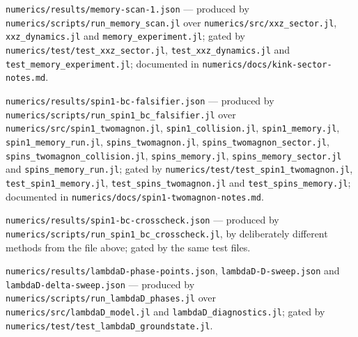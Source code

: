\texttt{numerics/\allowbreak{}results/\allowbreak{}memory-\allowbreak{}scan-\allowbreak{}1.json} --- produced by
\texttt{numerics/\allowbreak{}scripts/\allowbreak{}run\_\allowbreak{}memory\_\allowbreak{}scan.jl} over
\texttt{numerics/\allowbreak{}src/\allowbreak{}xxz\_\allowbreak{}sector.jl}, \texttt{xxz\_\allowbreak{}dynamics.jl} and
\texttt{memory\_\allowbreak{}experiment.jl}; gated by
\texttt{numerics/\allowbreak{}test/\allowbreak{}test\_\allowbreak{}xxz\_\allowbreak{}sector.jl},
\texttt{test\_\allowbreak{}xxz\_\allowbreak{}dynamics.jl} and \texttt{test\_\allowbreak{}memory\_\allowbreak{}experiment.jl};
documented in \texttt{numerics/\allowbreak{}docs/\allowbreak{}kink-\allowbreak{}sector-\allowbreak{}notes.md}.

\texttt{numerics/\allowbreak{}results/\allowbreak{}spin1-\allowbreak{}bc-\allowbreak{}falsifier.json} --- produced by
\texttt{numerics/\allowbreak{}scripts/\allowbreak{}run\_\allowbreak{}spin1\_\allowbreak{}bc\_\allowbreak{}falsifier.jl} over
\texttt{numerics/\allowbreak{}src/\allowbreak{}spin1\_\allowbreak{}twomagnon.jl}, \texttt{spin1\_\allowbreak{}collision.jl},
\texttt{spin1\_\allowbreak{}memory.jl}, \texttt{spin1\_\allowbreak{}memory\_\allowbreak{}run.jl},
\texttt{spins\_\allowbreak{}twomagnon.jl}, \texttt{spins\_\allowbreak{}twomagnon\_\allowbreak{}sector.jl},
\texttt{spins\_\allowbreak{}twomagnon\_\allowbreak{}collision.jl}, \texttt{spins\_\allowbreak{}memory.jl},
\texttt{spins\_\allowbreak{}memory\_\allowbreak{}sector.jl} and \texttt{spins\_\allowbreak{}memory\_\allowbreak{}run.jl}; gated by
\texttt{numerics/\allowbreak{}test/\allowbreak{}test\_\allowbreak{}spin1\_\allowbreak{}twomagnon.jl},
\texttt{test\_\allowbreak{}spin1\_\allowbreak{}memory.jl}, \texttt{test\_\allowbreak{}spins\_\allowbreak{}twomagnon.jl} and
\texttt{test\_\allowbreak{}spins\_\allowbreak{}memory.jl}; documented in
\texttt{numerics/\allowbreak{}docs/\allowbreak{}spin1-\allowbreak{}twomagnon-\allowbreak{}notes.md}.

\texttt{numerics/\allowbreak{}results/\allowbreak{}spin1-\allowbreak{}bc-\allowbreak{}crosscheck.json} --- produced by
\texttt{numerics/\allowbreak{}scripts/\allowbreak{}run\_\allowbreak{}spin1\_\allowbreak{}bc\_\allowbreak{}crosscheck.jl}, by deliberately
different methods from the file above; gated by the same test files.

\texttt{numerics/\allowbreak{}results/\allowbreak{}lambdaD-\allowbreak{}phase-\allowbreak{}points.json},
\texttt{lambdaD-\allowbreak{}D-\allowbreak{}sweep.json} and \texttt{lambdaD-\allowbreak{}delta-\allowbreak{}sweep.json} ---
produced by \texttt{numerics/\allowbreak{}scripts/\allowbreak{}run\_\allowbreak{}lambdaD\_\allowbreak{}phases.jl} over
\texttt{numerics/\allowbreak{}src/\allowbreak{}lambdaD\_\allowbreak{}model.jl} and
\texttt{lambdaD\_\allowbreak{}diagnostics.jl}; gated by
\texttt{numerics/\allowbreak{}test/\allowbreak{}test\_\allowbreak{}lambdaD\_\allowbreak{}groundstate.jl}.


